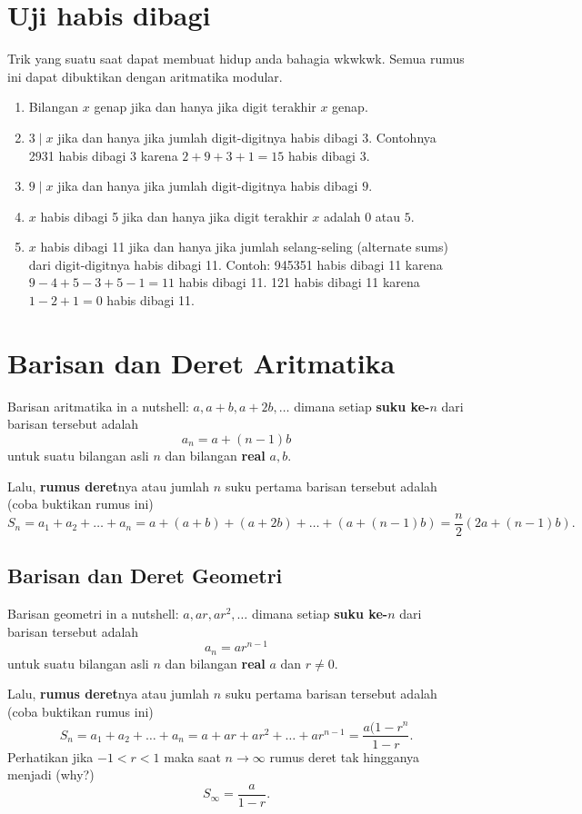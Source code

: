 	     \section{Uji habis dibagi}
	         Trik yang suatu saat dapat membuat hidup anda bahagia wkwkwk. Semua rumus ini dapat dibuktikan dengan aritmatika modular.
	         \begin{enumerate}
	             \item Bilangan $x$ genap jika dan hanya jika digit terakhir $x$ genap.
	             \item $3 \mid x$ jika dan hanya jika jumlah digit-digitnya habis dibagi $3$. Contohnya 2931 habis dibagi 3 karena $2+9+3+1=15$ habis dibagi 3.
	             \item $9 \mid x$ jika dan hanya jika jumlah digit-digitnya habis dibagi $9$.
	             \item $x$ habis dibagi 5 jika dan hanya jika digit terakhir $x$ adalah $0$ atau $5$.
	             \item $x$ habis dibagi 11 jika dan hanya jika jumlah selang-seling (alternate sums) dari digit-digitnya habis dibagi 11. Contoh: 945351 habis dibagi 11 karena $9-4+5-3+5-1=11$ habis dibagi 11. 121 habis dibagi 11 karena $1-2+1=0$ habis dibagi 11.
	         \end{enumerate}
	         
\section{Barisan dan Deret Aritmatika}
    Barisan aritmatika in a nutshell: $a,a+b,a+2b,\dots$ dimana setiap \textbf{suku ke-$n$} dari barisan tersebut adalah $$a_n=a+(n-1)b$$ untuk suatu bilangan asli $n$ dan bilangan \textbf{real} $a,b$.
    
    Lalu, \textbf{rumus deret}nya atau jumlah $n$ suku pertama barisan tersebut adalah (coba buktikan rumus ini) $$S_n = a_1+a_2+\dots+a_n=a+(a+b)+(a+2b)+\dots+(a+(n-1)b)=\dfrac{n}{2}(2a+(n-1)b).$$
    
    \subsection{Barisan dan Deret Geometri}
     Barisan geometri in a nutshell: $a,ar,ar^2,\dots$ dimana setiap \textbf{suku ke-$n$} dari barisan tersebut adalah $$a_n=ar^{n-1}$$ untuk suatu bilangan asli $n$ dan bilangan \textbf{real} $a$ dan $r \neq 0$.
    
    Lalu, \textbf{rumus deret}nya atau jumlah $n$ suku pertama barisan tersebut adalah (coba buktikan rumus ini) $$S_n = a_1+a_2+\dots+a_n=a+ar+ar^2+\dots+ar^{n-1}=\dfrac{a(1-r^n}{1-r}.$$
    Perhatikan jika $-1 < r < 1$ maka saat $n \rightarrow \infty$ rumus deret tak hingganya menjadi (why?) $$S_\infty =  \dfrac{a}{1-r}.$$
    
